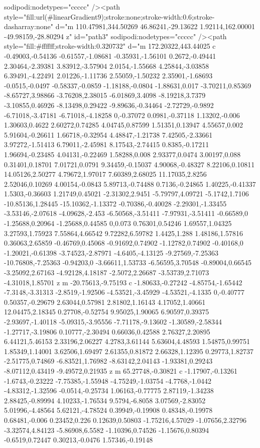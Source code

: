                 sodipodi:nodetypes="ccccc" /><path
                style="fill:url(#linearGradient9);stroke:none;stroke-width:0.6;stroke-dasharray:none"
                d="m 110.47981,344.50269 46.86241,-29.13622 1.92114,162.00001 -49.98159,-28.80294 z"
                id="path3"
                sodipodi:nodetypes="ccccc" /><path
                style="fill:#ffffff;stroke-width:0.320732"
                d="m 172.20322,443.44025 c -0.49003,-0.54136 -0.61557,-1.08681 -0.35931,-1.56101 0.2672,-0.49441 2.30464,-2.39381 3.83912,-3.57904 2.0154,-1.55668 4.25844,-3.03858 6.39491,-4.22491 2.01226,-1.11736 2.55059,-1.50232 2.35901,-1.68693 -0.0515,-0.0497 -0.58337,-0.0859 -1.18188,-0.0804 -1.88631,0.017 -3.70211,0.85369 -8.65727,3.98866 -3.76208,2.38015 -6.01869,3.4098 -8.19218,3.7379 -3.10855,0.46926 -8.13498,0.29422 -9.89636,-0.34464 -2.72729,-0.9892 -6.71018,-3.47181 -6.71018,-4.18258 0,-0.37072 0.0981,-0.37118 1.13202,-0.006 1.30603,0.4622 2.60272,0.74285 4.04745,0.87599 1.51351,0.13947 4.55657,0.002 5.91604,-0.26611 1.66718,-0.32954 4.48847,-1.21738 7.42505,-2.33661 3.97272,-1.51413 6.79011,-2.45981 8.17543,-2.74415 0.8385,-0.17211 1.96694,-0.23485 4.04131,-0.22469 1.58288,0.008 2.93377,0.0474 3.00197,0.088 0.31401,0.18701 7.01721,0.0791 9.34459,-0.15037 4.90068,-0.48327 8.22106,0.10811 14.05126,2.50277 4.79672,1.97017 7.60389,2.68025 11.17035,2.8256 2.52046,0.10269 4.00154,-0.0843 5.89713,-0.74488 0.7136,-0.24865 1.40225,-0.41337 1.5303,-0.36603 1.21749,0.45021 -2.31302,2.9451 -5.79797,4.09721 -5.1742,1.7106 -10.85136,1.28445 -15.10362,-1.13372 -0.70386,-0.40028 -2.29301,-1.33455 -3.53146,-2.07618 -4.09628,-2.453 -6.50568,-3.51411 -7.97931,-3.51411 -0.66589,0 -1.25688,0.20964 -1.25688,0.44585 0,0.073 0.76301,0.54246 1.69557,1.04325 3.27593,1.75923 7.55864,4.66542 9.72282,6.59782 1.4425,1.288 1.48186,1.57816 0.36063,2.65859 -0.46769,0.45068 -0.91692,0.74902 -1.12782,0.74902 -0.40168,0 -1.20021,-0.61398 -3.74523,-2.87971 -4.6405,-4.13125 -9.27569,-7.25363 -10.76808,-7.25363 -0.94203,0 -3.66611,1.53733 -6.56595,3.70548 -0.89004,0.66545 -3.25092,2.67163 -4.92128,4.18187 -2.5072,2.26687 -3.53739,2.71073 -4.31018,1.85701 z m -20.75613,-9.75193 c -1.80633,-0.27242 -4.85754,-1.65442 -7.3148,-3.31313 -2.8519,-1.92506 -4.53521,-3.45929 -4.53521,-4.1335 0,-0.40777 0.50357,-0.29679 2.63044,0.57981 2.81802,1.16143 4.17052,1.40661 12.04475,2.18345 0.27708,-0.52754 9.95025,1.90065 6.90597,0.39375 -2.93697,-1.40118 -5.09315,-3.95556 -7.71178,-9.13602 -1.30589,-2.58344 -1.27717,-3.19806 0.10777,-2.30494 0.66036,0.42588 2.76327,2.20895 6.44121,5.46153 2.33196,2.06227 4.2783,3.61144 5.63604,4.48593 1.54875,0.99751 1.85349,1.14001 3.62506,1.69497 2.61355,0.81872 2.66328,1.12395 0.29773,1.82737 -2.51775,0.74869 -6.83521,1.76982 -8.63142,2.04143 -1.93381,0.29243 -8.07112,0.43419 -9.49572,0.21935 z m 65.27748,-0.30821 c -1.17907,-0.13261 -1.6743,-0.23222 -7.75385,-1.55948 -4.75249,-1.03754 -4.7768,-1.0442 -4.83312,-1.32596 -0.0514,-0.25734 1.06163,-0.77775 2.87119,-1.34238 2.88425,-0.89994 4.10233,-1.76534 9.5794,-6.8058 3.07569,-2.83052 5.01996,-4.48564 5.62121,-4.78524 0.39949,-0.19908 0.48348,-0.19978 0.68481,-0.006 0.23452,0.226 0.12639,0.50803 -1.75216,4.57029 -1.07656,2.32796 -3.32574,4.84123 -5.86908,6.5582 -1.10396,0.74526 -1.15676,0.80394 -0.6519,0.72447 0.30213,-0.0476 1.57346,-0.19148 
